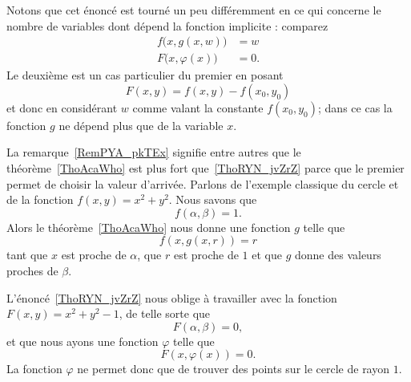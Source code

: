 \begin{remark}\label{RemPYA_pkTEx}
	Notons que cet énoncé est tourné un peu différemment en ce qui concerne le nombre de variables dont dépend la fonction implicite : comparez
	\begin{subequations}
		\begin{align}
			f\big( x,g(x,w) \big)     & = w  \\
			F\big( x,\varphi(x) \big) & = 0.
		\end{align}
	\end{subequations}
	Le deuxième est un cas particulier du premier en posant
	\begin{equation}
		F(x,y)=f(x,y)-f(x_0,y_0)
	\end{equation}
	et donc en considérant \( w\) comme valant la constante \( f(x_0,y_0)\); dans ce cas la fonction \( g\) ne dépend plus que de la variable \( x\).
\end{remark}

\begin{example}
	La remarque~\ref{RemPYA_pkTEx} signifie entre autres que le théorème~\ref{ThoAcaWho} est plus fort que~\ref{ThoRYN_jvZrZ} parce que le premier permet de choisir la valeur d'arrivée. Parlons de l'exemple classique du cercle et de la fonction \( f(x,y)=x^2+y^2\). Nous savons que
	\begin{equation}
		f(\alpha,\beta)=1.
	\end{equation}
	Alors le théorème~\ref{ThoAcaWho} nous donne une fonction \( g\) telle que
	\begin{equation}
		f(x,g(x,r))=r
	\end{equation}
	tant que \( x\) est proche de \( \alpha\), que \( r\) est proche de \( 1\) et que \( g\) donne des valeurs proches de \( \beta\).

	L'énoncé~\ref{ThoRYN_jvZrZ} nous oblige à travailler avec la fonction \( F(x,y)=x^2+y^2-1\), de telle sorte que
	\begin{equation}
		F(\alpha,\beta)=0,
	\end{equation}
	et que nous ayons une fonction \( \varphi\) telle que
	\begin{equation}
		F(x,\varphi(x))=0.
	\end{equation}
	La fonction \( \varphi\) ne permet donc que de trouver des points sur le cercle de rayon \( 1\).
\end{example}

